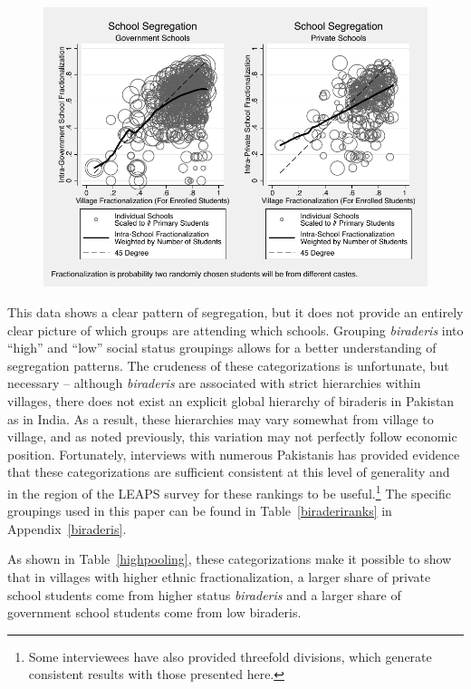 \documentclass[12pt]{article}
\begin{document}
\begin{figure}[H]
	\begin{center}
	\caption{}\label{schoolvvillageherf}
	\includegraphics[scale=1.0]{graphs/intra_versus_intervillage_frac_combined.pdf}
	\end{center}
\end{figure}

This data shows a clear pattern of segregation, but it does not provide an entirely clear picture of which groups are attending which schools.  Grouping \emph{biraderis} into ``high'' and ``low'' social status groupings allows for a better understanding of segregation patterns. The crudeness of these categorizations is unfortunate, but necessary -- although \emph{biraderis} are associated with strict hierarchies within villages, there does not exist an explicit global hierarchy of biraderis in Pakistan as in India. As a result, these hierarchies may vary somewhat from village to village, and as noted previously, this variation may not perfectly follow economic position. Fortunately, interviews with numerous Pakistanis has provided evidence that these categorizations are sufficient consistent at this level of generality and in the region of the LEAPS survey for these rankings to be useful.\footnote{Some interviewees have also provided threefold divisions, which generate consistent results with those presented here.} The specific groupings used in this paper can be found in Table~\ref{biraderiranks} in Appendix~\ref{biraderis}.

As shown in Table~\ref{highpooling}, these categorizations make it possible to show that in villages with higher ethnic fractionalization, a larger share of private school students come from higher status \emph{biraderis} and a larger share of government school students come from low biraderis.
\end{document}
